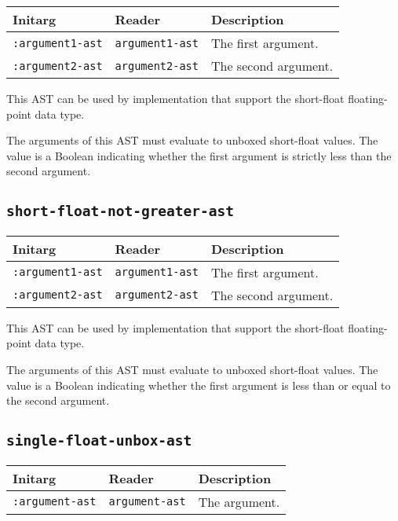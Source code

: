 \begin{tabular}{|l|l|l|}
\hline
Initarg & Reader & Description\\
\hline\hline
\texttt{:argument1-ast} & \texttt{argument1-ast} & The first argument.\\
\hline
\texttt{:argument2-ast} & \texttt{argument2-ast} & The second argument.\\
\hline
\end{tabular}

This AST can be used by implementation that support the short-float
floating-point data type.  

The arguments of this AST must evaluate to unboxed short-float
values.  The value is a Boolean indicating whether the first argument
is strictly less than the second argument.

\subsection{\texttt{short-float-not-greater-ast}}
\label{sec-ast-short-float-not-greater}

\begin{tabular}{|l|l|l|}
\hline
Initarg & Reader & Description\\
\hline\hline
\texttt{:argument1-ast} & \texttt{argument1-ast} & The first argument.\\
\hline
\texttt{:argument2-ast} & \texttt{argument2-ast} & The second argument.\\
\hline
\end{tabular}

This AST can be used by implementation that support the short-float
floating-point data type.  

The arguments of this AST must evaluate to unboxed short-float
values.  The value is a Boolean indicating whether the first argument
is less than or equal to the second argument.

\subsection{\texttt{single-float-unbox-ast}}
\label{sec-ast-single-float-unbox}

\begin{tabular}{|l|l|l|}
\hline
Initarg & Reader & Description\\
\hline\hline
\texttt{:argument-ast} & \texttt{argument-ast} & The argument.\\
\hline
\end{tabular}

